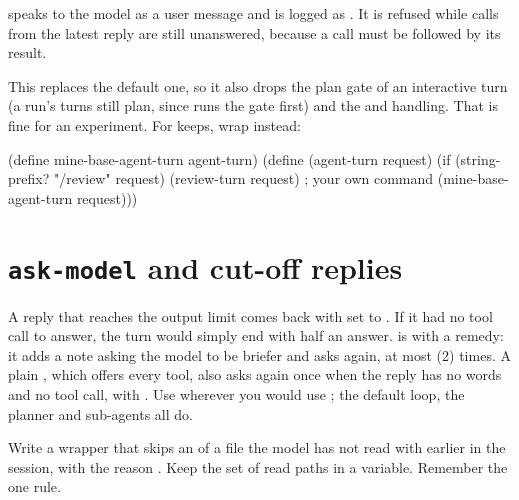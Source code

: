  speaks to the model as a user message and is logged as
. It is refused while calls from the latest reply are
still unanswered, because a call must be followed by its result.

This  replaces the default one, so it also drops the plan
gate of an interactive turn (a run's turns still plan, since
 runs the gate first) and the  and
 handling. That is fine for an experiment. For keeps, wrap
instead:

\begin{scm}
(define mine-base-agent-turn agent-turn)
(define (agent-turn request)
  (if (string-prefix? "/review" request)
      (review-turn request)              ; your own command
      (mine-base-agent-turn request)))
\end{scm}

\section{\texttt{ask-model} and cut-off replies}

A reply that reaches the output limit comes back with  set to
. If it had no tool call to answer, the turn would simply
end with half an answer.  is  with a
remedy: it adds a note asking the model to be briefer and asks again, at
most  (2) times. A plain , which
offers every tool, also asks again once when the reply has no words and no
tool call, with . Use  wherever you
would use ; the default loop, the planner and sub-agents
all do.

\begin{puzzle}
Write a  wrapper that skips an  of a file the
model has not read with  earlier in the session, with the
reason . Keep the set of read paths
in a variable. Remember the one rule.
\end{puzzle}

